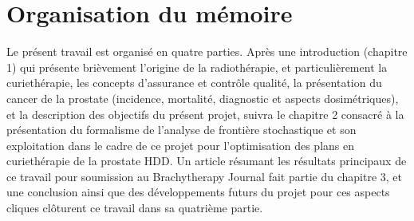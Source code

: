 \section{Organisation du mémoire}
Le présent travail est organisé en quatre parties. Après une introduction (chapitre 1) qui présente brièvement l'origine de la radiothérapie, et particulièrement la curiethérapie, les concepts d'assurance et contrôle qualité, la présentation du cancer de la prostate (incidence, mortalité, diagnostic et aspects dosimétriques), et la description des objectifs du présent projet, suivra le chapitre 2 consacré à la présentation du formalisme de l’analyse de frontière stochastique et son exploitation dans le cadre de ce projet pour l’optimisation des plans en curiethérapie de la prostate HDD. Un article résumant les résultats principaux de ce travail pour soumission au Brachytherapy Journal fait partie du chapitre 3, et une conclusion ainsi que des développements futurs du projet pour ces aspects cliques clôturent ce travail dans sa quatrième partie.
%